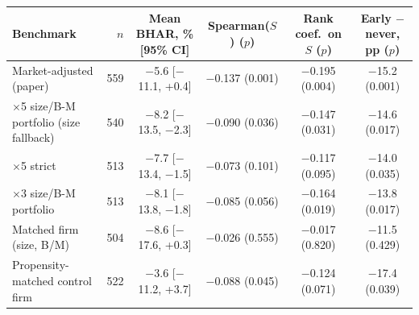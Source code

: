 \begin{tabular}{>{\raggedright\arraybackslash}p{4.6cm}rcccc}
\toprule
Benchmark & $n$ & Mean BHAR, \% [95\% CI] & Spearman($S$) ($p$) & Rank coef.\ on $S$ ($p$) & Early $-$ never, pp ($p$) \\
\midrule
Market-adjusted (paper) & 559 & $-$5.6 [$-$11.1, +0.4] & $-$0.137 (0.001) & $-$0.195 (0.004) & $-$15.2 (0.001) \\
5$\times$5 size/B-M portfolio (size fallback) & 540 & $-$8.2 [$-$13.5, $-$2.3] & $-$0.090 (0.036) & $-$0.147 (0.031) & $-$14.6 (0.017) \\
5$\times$5 strict & 513 & $-$7.7 [$-$13.4, $-$1.5] & $-$0.073 (0.101) & $-$0.117 (0.095) & $-$14.0 (0.035) \\
3$\times$3 size/B-M portfolio & 513 & $-$8.1 [$-$13.8, $-$1.8] & $-$0.085 (0.056) & $-$0.164 (0.019) & $-$13.8 (0.017) \\
Matched firm (size, B/M) & 504 & $-$8.6 [$-$17.6, +0.3] & $-$0.026 (0.555) & $-$0.017 (0.820) & $-$11.5 (0.429) \\
Propensity-matched control firm & 522 & $-$3.6 [$-$11.2, +3.7] & $-$0.088 (0.045) & $-$0.124 (0.071) & $-$17.4 (0.039) \\
\bottomrule
\end{tabular}
